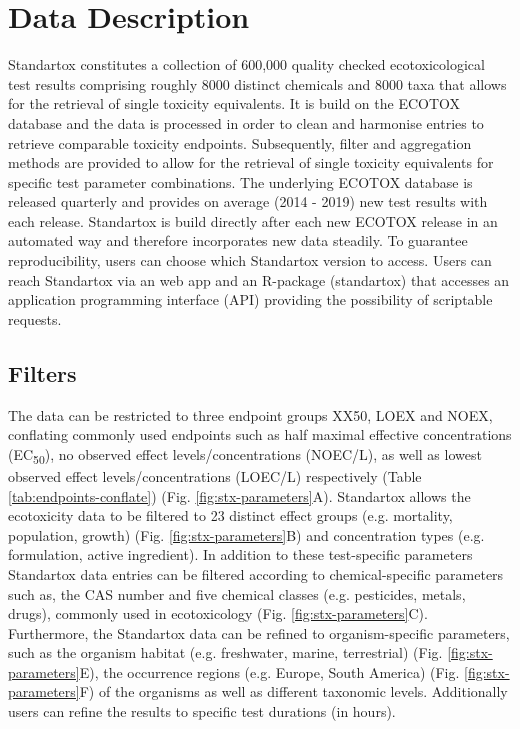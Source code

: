 \section{Data Description}
Standartox constitutes a collection of 600,000 quality checked ecotoxicological test results comprising roughly 8000 distinct chemicals and 8000 taxa that allows for the retrieval of single toxicity equivalents. It is build on the ECOTOX database \citep{usepa_ecotox_2019} and the data is processed in order to clean and harmonise entries to retrieve comparable toxicity endpoints. Subsequently, filter and aggregation methods are provided to allow for the retrieval of single toxicity equivalents for specific test parameter combinations. The underlying ECOTOX database is released quarterly and provides on average  (2014 - 2019) new test results with each release. Standartox is build directly after each new ECOTOX release in an automated way and therefore incorporates new data steadily. To guarantee reproducibility, users can choose which Standartox version to access. Users can reach Standartox via an web app and an R-package (standartox) that accesses an application programming interface (API) providing the possibility of scriptable requests.

\subsection{Filters}
The data can be restricted to three endpoint groups XX50, LOEX and NOEX, conflating commonly used endpoints such as half maximal effective concentrations (EC\textsubscript{50}), no observed effect levels/concentrations (NOEC/L), as well as lowest observed effect levels/concentrations (LOEC/L) respectively (Table \ref{tab:endpoints-conflate}) (Fig. \ref{fig:stx-parameters}A). Standartox allows the ecotoxicity data to be filtered to 23 distinct effect groups (e.g. mortality, population, growth) (Fig. \ref{fig:stx-parameters}B) and concentration types (e.g. formulation, active ingredient). In addition to these test-specific parameters Standartox data entries can be filtered according to chemical-specific parameters such as, the CAS number and five chemical classes (e.g. pesticides, metals, drugs), commonly used in ecotoxicology (Fig. \ref{fig:stx-parameters}C). Furthermore, the Standartox data can be refined to organism-specific parameters, such as the organism habitat (e.g. freshwater, marine, terrestrial) (Fig. \ref{fig:stx-parameters}E), the occurrence regions (e.g. Europe, South America) (Fig. \ref{fig:stx-parameters}F) of the organisms as well as different taxonomic levels. Additionally users can refine the results to specific test durations (in hours).

